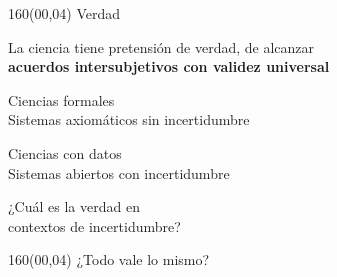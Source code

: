 \documentclass[shownotes,aspectratio=169]{beamer}
\begin{document}
\begin{frame}[plain]
\begin{textblock}{160}(00,04)
\centering
\LARGE Verdad
\end{textblock}
\vspace{1.5cm} \large

\centering

 La ciencia tiene pretensión de verdad, de alcanzar\\

\textbf{acuerdos intersubjetivos con validez universal}

\vspace{0.7cm}

\pause

 \large Ciencias formales  \\
 \large  Sistemas axiomáticos sin incertidumbre\\

 \vspace{0.3cm}

  \pause

 \large Ciencias con datos  \\
\large Sistemas abiertos con incertidumbre

\pause
\vspace{0.6cm}

\Large

¿Cuál es la verdad en \\ contextos de incertidumbre?
%
%
%

\end{frame}


\begin{frame}[plain]
\begin{textblock}{160}(00,04)
\centering
\LARGE ¿Todo vale lo mismo?\\
\end{textblock}
\vspace{1cm} \large



\end{frame}
\end{document}
